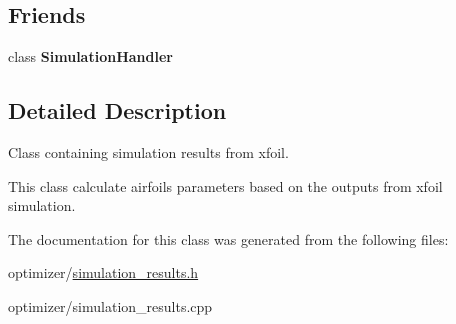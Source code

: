 \subsection*{Friends}
\begin{DoxyCompactItemize}
\item 
\hypertarget{class_sim_results_a88881bfc7b707b9bf91fd177fefa2e04}{}\label{class_sim_results_a88881bfc7b707b9bf91fd177fefa2e04} 
class {\bfseries Simulation\+Handler}
\end{DoxyCompactItemize}


\subsection{Detailed Description}
Class containing simulation results from xfoil. 

This class calculate airfoil\textquotesingle{}s parameters based on the outputs from xfoil simulation. 

The documentation for this class was generated from the following files\+:\begin{DoxyCompactItemize}
\item 
optimizer/\hyperlink{simulation__results_8h}{simulation\+\_\+results.\+h}\item 
optimizer/simulation\+\_\+results.\+cpp\end{DoxyCompactItemize}
